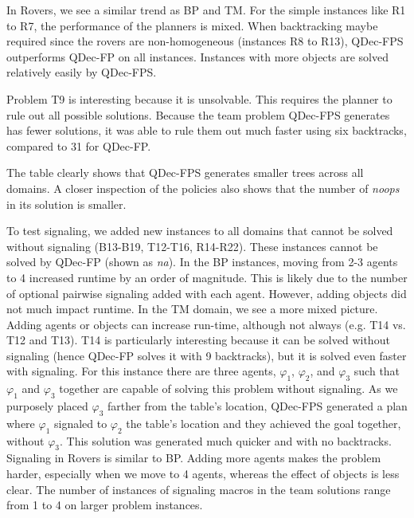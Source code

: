 \documentclass[letterpaper]{article}
\theoremstyle{definition}
\begin{document}
In Rovers, we see a similar trend as BP and TM.
For the simple instances like R1 to R7, the performance of the planners is mixed.
When backtracking maybe required since the rovers are non-homogeneous (instances R8 to R13), QDec-FPS outperforms QDec-FP on all instances. Instances with more objects are solved relatively easily by QDec-FPS.














Problem T9 is interesting because it is unsolvable.
This requires the planner to rule out all possible solutions. Because the team problem QDec-FPS generates has fewer solutions, it was able to
rule them out much faster
using six backtracks, compared to 31 for QDec-FP.

The table clearly shows that QDec-FPS generates smaller trees across all domains. A closer inspection of the policies also shows that the number of {\em noops} in its solution is smaller.

To test signaling, we added new instances to all domains that cannot be solved without signaling (B13-B19, T12-T16, R14-R22). These instances cannot be solved
by QDec-FP (shown as \emph{na}).
In the BP instances, moving from 2-3 agents to 4 increased runtime by an order of magnitude. This is likely due to the number of optional pairwise signaling added with each agent. However, adding objects did not much impact runtime.
In the TM domain, we see a more mixed picture. Adding agents or objects can increase run-time, although not always (e.g. T14 vs. T12 and T13).
T14 is particularly interesting because it can be solved without signaling (hence QDec-FP solves it with 9 backtracks), but it is solved even faster with signaling.
For this instance there are three agents, $\varphi_1$, $\varphi_2$, and $\varphi_3$ such that $\varphi_1$ and $\varphi_3$ together are capable of solving this problem without signaling.
As we purposely placed $\varphi_3$ farther from the table's location, QDec-FPS generated a plan where $\varphi_1$ signaled to $\varphi_2$ the table's location and they achieved the goal together, without $\varphi_3$. This solution was generated much quicker and with no backtracks.
Signaling in Rovers is similar to BP.
Adding more agents makes the problem harder,
especially when we move to 4 agents, whereas the effect of objects is less clear.
The number of instances of signaling macros in the team solutions range from 1 to 4 on larger problem instances.
\end{document}
